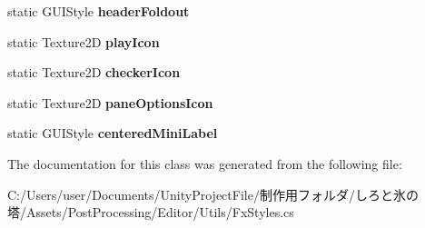 \begin{DoxyCompactItemize}
static G\+U\+I\+Style {\bfseries header\+Foldout}
\item 
\mbox{\label{class_unity_editor_1_1_post_processing_1_1_fx_styles_ad5293b51f5f04334286514d676de5475}} 
static Texture2D {\bfseries play\+Icon}
\item 
\mbox{\label{class_unity_editor_1_1_post_processing_1_1_fx_styles_a978f864c0af96f3cbd263e5831d9349c}} 
static Texture2D {\bfseries checker\+Icon}
\item 
\mbox{\label{class_unity_editor_1_1_post_processing_1_1_fx_styles_a4740d034349eaa1ce199392817517e1e}} 
static Texture2D {\bfseries pane\+Options\+Icon}
\item 
\mbox{\label{class_unity_editor_1_1_post_processing_1_1_fx_styles_a996137007d1ea6b3488dffd376000a35}} 
static G\+U\+I\+Style {\bfseries centered\+Mini\+Label}
\end{DoxyCompactItemize}


The documentation for this class was generated from the following file\+:\begin{DoxyCompactItemize}
\item 
C\+:/\+Users/user/\+Documents/\+Unity\+Project\+File/制作用フォルダ/しろと氷の塔/\+Assets/\+Post\+Processing/\+Editor/\+Utils/Fx\+Styles.\+cs\end{DoxyCompactItemize}

